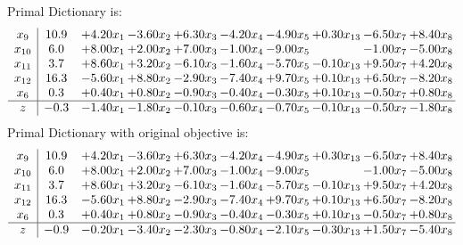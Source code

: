 \documentclass[9pt]{article}
\begin{document}
Primal Dictionary is:
\[\begin{array}{c| c c@{\hskip 2pt} c@{\hskip 2pt} c@{\hskip 2pt} c@{\hskip 2pt} c@{\hskip 2pt} c@{\hskip 2pt} c@{\hskip 2pt} c@{\hskip 2pt} }
 x_{9}   &  10.9 & +  4.20 x_{1} & -3.60 x_{2} & +  6.30 x_{3} & -4.20 x_{4} & -4.90 x_{5} & +  0.30 x_{13} & -6.50 x_{7} & +  8.40 x_{8}\\
 x_{10}   &  6.0 & +  8.00 x_{1} & +  2.00 x_{2} & +  7.00 x_{3} & -1.00 x_{4} & -9.00 x_{5} &   & -1.00 x_{7} & -5.00 x_{8}\\
 x_{11}   &  3.7 & +  8.60 x_{1} & +  3.20 x_{2} & -6.10 x_{3} & -1.60 x_{4} & -5.70 x_{5} & -0.10 x_{13} & +  9.50 x_{7} & +  4.20 x_{8}\\
 x_{12}   &  16.3 & -5.60 x_{1} & +  8.80 x_{2} & -2.90 x_{3} & -7.40 x_{4} & +  9.70 x_{5} & +  0.10 x_{13} & +  6.50 x_{7} & -8.20 x_{8}\\
 x_{6}   &  0.3 & +  0.40 x_{1} & +  0.80 x_{2} & -0.90 x_{3} & -0.40 x_{4} & -0.30 x_{5} & +  0.10 x_{13} & -0.50 x_{7} & +  0.80 x_{8}\\
\hline
z    &  -0.3 & -1.40 x_{1} & -1.80 x_{2} & -0.10 x_{3} & -0.60 x_{4} & -0.70 x_{5} & -0.10 x_{13} & -0.50 x_{7} & -1.80 x_{8}\\
\end{array}\]
Primal Dictionary with original objective is:
\[\begin{array}{c| c c@{\hskip 2pt} c@{\hskip 2pt} c@{\hskip 2pt} c@{\hskip 2pt} c@{\hskip 2pt} c@{\hskip 2pt} c@{\hskip 2pt} c@{\hskip 2pt} }
 x_{9}   &  10.9 & +  4.20 x_{1} & -3.60 x_{2} & +  6.30 x_{3} & -4.20 x_{4} & -4.90 x_{5} & +  0.30 x_{13} & -6.50 x_{7} & +  8.40 x_{8}\\
 x_{10}   &  6.0 & +  8.00 x_{1} & +  2.00 x_{2} & +  7.00 x_{3} & -1.00 x_{4} & -9.00 x_{5} &   & -1.00 x_{7} & -5.00 x_{8}\\
 x_{11}   &  3.7 & +  8.60 x_{1} & +  3.20 x_{2} & -6.10 x_{3} & -1.60 x_{4} & -5.70 x_{5} & -0.10 x_{13} & +  9.50 x_{7} & +  4.20 x_{8}\\
 x_{12}   &  16.3 & -5.60 x_{1} & +  8.80 x_{2} & -2.90 x_{3} & -7.40 x_{4} & +  9.70 x_{5} & +  0.10 x_{13} & +  6.50 x_{7} & -8.20 x_{8}\\
 x_{6}   &  0.3 & +  0.40 x_{1} & +  0.80 x_{2} & -0.90 x_{3} & -0.40 x_{4} & -0.30 x_{5} & +  0.10 x_{13} & -0.50 x_{7} & +  0.80 x_{8}\\
\hline
z    &  -0.9 & -0.20 x_{1} & -3.40 x_{2} & -2.30 x_{3} & -0.80 x_{4} & -2.10 x_{5} & -0.30 x_{13} & +  1.50 x_{7} & -5.40 x_{8}\\
\end{array}\]
\end{document}
